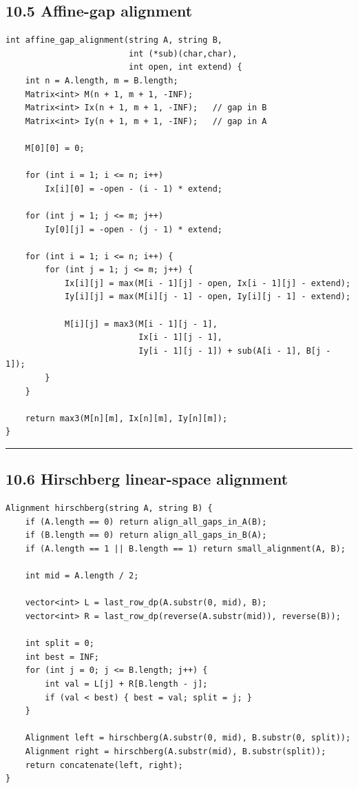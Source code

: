 \documentclass[11pt]{article}
\begin{document}
\subsection{10.5 Affine-gap alignment}\label{affine-gap-alignment}

\begin{verbatim}
int affine_gap_alignment(string A, string B,
                         int (*sub)(char,char),
                         int open, int extend) {
    int n = A.length, m = B.length;
    Matrix<int> M(n + 1, m + 1, -INF);
    Matrix<int> Ix(n + 1, m + 1, -INF);   // gap in B
    Matrix<int> Iy(n + 1, m + 1, -INF);   // gap in A

    M[0][0] = 0;

    for (int i = 1; i <= n; i++)
        Ix[i][0] = -open - (i - 1) * extend;

    for (int j = 1; j <= m; j++)
        Iy[0][j] = -open - (j - 1) * extend;

    for (int i = 1; i <= n; i++) {
        for (int j = 1; j <= m; j++) {
            Ix[i][j] = max(M[i - 1][j] - open, Ix[i - 1][j] - extend);
            Iy[i][j] = max(M[i][j - 1] - open, Iy[i][j - 1] - extend);

            M[i][j] = max3(M[i - 1][j - 1],
                           Ix[i - 1][j - 1],
                           Iy[i - 1][j - 1]) + sub(A[i - 1], B[j - 1]);
        }
    }

    return max3(M[n][m], Ix[n][m], Iy[n][m]);
}
\end{verbatim}

\begin{center}\rule{0.5\linewidth}{0.5pt}\end{center}

\subsection{10.6 Hirschberg linear-space alignment}\label{hirschberg-linear-space-alignment}

\begin{verbatim}
Alignment hirschberg(string A, string B) {
    if (A.length == 0) return align_all_gaps_in_A(B);
    if (B.length == 0) return align_all_gaps_in_B(A);
    if (A.length == 1 || B.length == 1) return small_alignment(A, B);

    int mid = A.length / 2;

    vector<int> L = last_row_dp(A.substr(0, mid), B);
    vector<int> R = last_row_dp(reverse(A.substr(mid)), reverse(B));

    int split = 0;
    int best = INF;
    for (int j = 0; j <= B.length; j++) {
        int val = L[j] + R[B.length - j];
        if (val < best) { best = val; split = j; }
    }

    Alignment left = hirschberg(A.substr(0, mid), B.substr(0, split));
    Alignment right = hirschberg(A.substr(mid), B.substr(split));
    return concatenate(left, right);
}
\end{verbatim}
\end{document}
